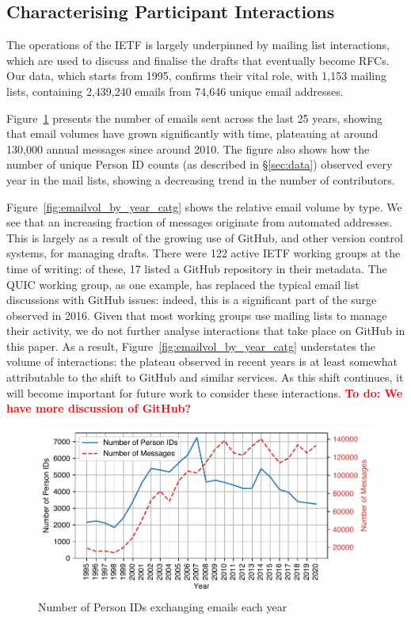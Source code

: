 \documentclass[twocolumn,10pt]{article}
\newlength{\figureWidthOneColumn}
\newcommand{\todo}[1]{\textbf{\textcolor{red}{To do: #1}}}
\newcommand{\pb}[1]{\vspace{0.75ex}\noindent{\textbf{#1}}}
\begin{document}
\subsection{Characterising Participant Interactions}
\label{sec:org-dynamics:participants}


The operations of the IETF is largely underpinned by mailing list
interactions, which are used to discuss and finalise the drafts that
eventually become RFCs. Our data, which starts from 1995, confirms their
vital role, with 1,153 mailing lists, containing 2,439,240 emails from
74,646 unique email addresses.

\pb{Volume of Discussion:}
Figure~\ref{fig:pid_count_emailing_yearly} presents the number of emails
sent across the last 25 years, showing that email volumes have grown
significantly with time, plateauing at around 130,000 annual messages since
around 2010. The figure also shows how the number of unique Person ID
counts (as described in \S\ref{sec:data}) observed every year in the mail
lists, showing a decreasing trend in the number of contributors.

Figure~\ref{fig:emailvol_by_year_catg} shows the relative email volume by
type. We see that an increasing fraction of messages originate from
automated addresses. This is largely as a result of the growing use of
GitHub, and other version control systems, for managing drafts. There were
122 active IETF working groups at the time of writing: of these, 17 listed
a GitHub repository in their metadata. The QUIC working group, as one
example, has replaced the typical email list discussions with GitHub
issues: indeed, this is a significant part of the surge observed in 2016.
Given that most working groups use mailing lists to manage their activity,
we do not further analyse interactions that take place on GitHub in this
paper. As a result, Figure~\ref{fig:emailvol_by_year_catg} understates the
volume of interactions: the plateau observed in recent years is at least
somewhat attributable to the shift to GitHub and similar services. As this
shift continues, it will become important for future work to consider these
interactions.
\todo{We have more discussion of GitHub?}


\begin{figure}
  \centering
  \includegraphics[width=\figureWidthOneColumn]{figures-prev/imc-2021/emails/pid_count_emailing_yearly.pdf}
  \caption{
    Number of Person IDs exchanging emails each year
  }
  \label{fig:pid_count_emailing_yearly}
\end{figure}
\end{document}

